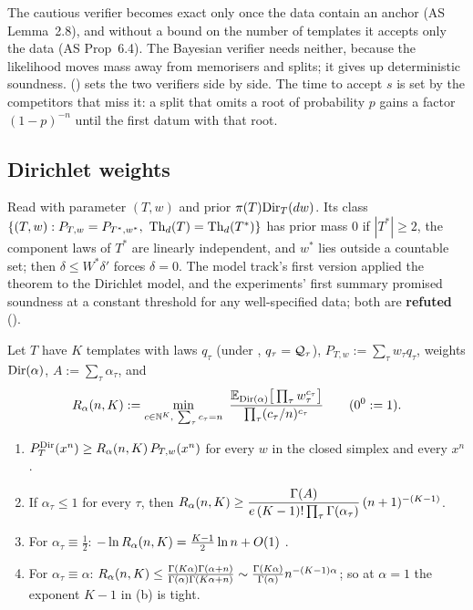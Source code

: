 The cautious verifier becomes exact only once the data contain an anchor (AS Lemma~2.8), and without a bound on the number of templates it accepts only the data (AS Prop~6.4). The Bayesian verifier needs neither, because the likelihood moves mass away from memorisers and splits; it gives up deterministic soundness.  () sets the two verifiers side by side. The time to accept $s$ is set by the competitors that miss it: a split that omits a root of probability $p$ gains a factor $(1-p)^{-n}$ until the first datum with that root.

\subsection{Dirichlet weights}\label{sec:sound:dir}

\begin{remark}\label{rem:sound:vacuous}
Read  with parameter $(T,w)$ and prior $\pi(T)\mathrm{Dir}_T(dw)$. Its class $\{(T,w):P_{T,w}=P_{T^*,w^*},\ \Th_d(T)=\Th_d(T^*)\}$ has prior mass $0$ if $|T^*|\ge2$, the component laws of $T^*$ are linearly independent, and $w^*$ lies outside a countable set; then $\delta\le W^*\delta'$ forces $\delta=0$. The model track's first version applied the theorem to the Dirichlet model, and the experiments' first summary promised soundness at a constant threshold for any well-specified data; both are \textbf{refuted} ().
\end{remark}

\begin{lemma}[Regret]\label{lem:sound:regret}
Let $T$ have $K$ templates with laws $q_\tau$ (under \Lzero, $q_\tau=\mathcal{Q}_\tau$), $P_{T,w}:=\sum_\tau w_\tau q_\tau$, weights $\mathrm{Dir}(\alpha)$, $A:=\sum_\tau\alpha_\tau$, and
\[
R_{\alpha}(n,K):=\min_{c\in\mathbb{N}^K,\ \sum_\tau c_\tau=n}\ \frac{\mathbb{E}_{\mathrm{Dir}(\alpha)}\big[\prod_\tau w_\tau^{c_\tau}\big]}{\prod_\tau(c_\tau/n)^{c_\tau}}\qquad(0^0:=1).
\]
\begin{enumerate}[label=(\alph*)]
\item $P^{\mathrm{Dir}}_{T}(x^n)\ge R_{\alpha}(n,K)\,P_{T,w}(x^n)$ for every $w$ in the closed simplex and every $x^n$.
\item If $\alpha_\tau\le1$ for every $\tau$, then $R_{\alpha}(n,K)\ge\dfrac{\Gamma(A)}{e\,(K-1)!\prod_\tau\Gamma(\alpha_\tau)}\,(n+1)^{-(K-1)}$.
\item For $\alpha_\tau\equiv\tfrac12$: $-\ln R_{\alpha}(n,K)=\tfrac{K-1}2\ln n+O(1)$ \citep{krichevsky1981performance}.
\item For $\alpha_\tau\equiv\alpha$: $R_{\alpha}(n,K)\le\frac{\Gamma(K\alpha)\Gamma(\alpha+n)}{\Gamma(\alpha)\Gamma(K\alpha+n)}\sim\frac{\Gamma(K\alpha)}{\Gamma(\alpha)}n^{-(K-1)\alpha}$; so at $\alpha=1$ the exponent $K-1$ in (b) is tight.
\end{enumerate}
\end{lemma}

